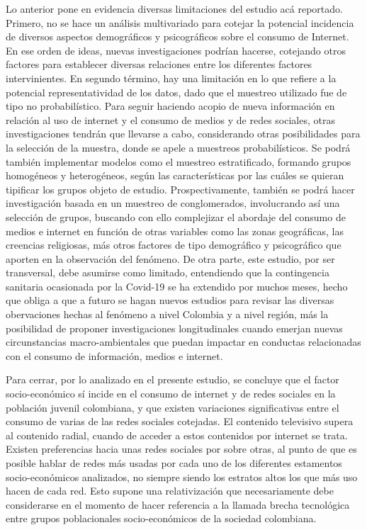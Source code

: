 \documentclass[spanish]{textolivre}
\begin{document}
Lo anterior pone en evidencia diversas limitaciones del estudio acá reportado. Primero, no se hace un análisis multivariado para cotejar la potencial incidencia de diversos aspectos demográficos y psicográficos sobre el consumo de Internet. En ese orden de ideas, nuevas investigaciones podrían hacerse, cotejando otros factores para establecer diversas relaciones entre los diferentes factores intervinientes. En segundo término, hay una limitación en lo que refiere a la potencial representatividad de los datos, dado que el muestreo utilizado fue de tipo no probabilístico. Para seguir haciendo acopio de nueva información en relación al uso de internet y el consumo de medios y de redes sociales, otras investigaciones tendrán que llevarse a cabo, considerando otras posibilidades para la selección de la muestra, donde se apele a muestreos probabilísticos. Se podrá también implementar modelos como el muestreo estratificado, formando grupos homogéneos y heterogéneos, según las características por las cuáles se quieran tipificar los grupos objeto de estudio. Prospectivamente, también se podrá hacer investigación basada en un muestreo de conglomerados, involucrando así una selección de grupos, buscando con ello complejizar el abordaje del consumo de medios e internet en función de otras variables como las zonas geográficas, las creencias religiosas, más otros factores de tipo demográfico y psicográfico que aporten en la observación del fenómeno. De otra parte, este estudio, por ser transversal, debe asumirse como limitado, entendiendo que la contingencia sanitaria ocasionada por la Covid-19 se ha extendido por muchos meses, hecho que obliga a que a futuro se hagan nuevos estudios para revisar las diversas obervaciones hechas al fenómeno a nivel Colombia y a nivel región, más la posibilidad de proponer investigaciones longitudinales cuando emerjan nuevas circunstancias macro-ambientales que puedan impactar en conductas relacionadas con el consumo de información, medios e internet.

Para cerrar, por lo analizado en el presente estudio, se concluye que el factor socio-económico sí incide en el consumo de internet y de redes sociales en la población juvenil colombiana, y que existen variaciones significativas entre el consumo de varias de las redes sociales cotejadas. El contenido televisivo supera al contenido radial, cuando de acceder a estos contenidos por internet se trata. Existen preferencias hacia unas redes sociales por sobre otras, al punto de que es posible hablar de redes más usadas por cada uno de los diferentes estamentos socio-económicos analizados, no siempre siendo los estratos altos los que más uso hacen de cada red. Esto supone una relativización que necesariamente debe considerarse en el momento de hacer referencia a la llamada brecha tecnológica entre grupos poblacionales socio-económicos de la sociedad colombiana.
\end{document}
